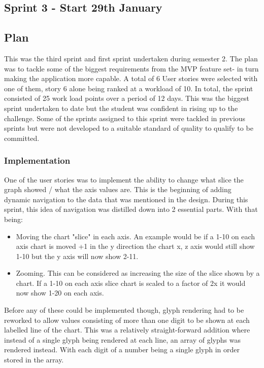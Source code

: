 \subsection{Sprint 3 - Start 29th January}
\subsection{Plan}
This was the third sprint and first sprint undertaken during semester 2. The plan was to tackle some of the biggest requirements from the MVP feature set- in turn making the application more capable. A total of 6 User stories were selected with one of them, story 6 alone being ranked at a workload of 10. In total, the sprint consisted of 25 work load points over a period of 12 days. This was the biggest sprint undertaken to date but the student was confident in rising up to the challenge. Some of the sprints assigned to this sprint were tackled in previous sprints but were not developed to a suitable standard of quality to qualify to be committed.

\subsubsection{Implementation}

One of the user stories was to implement the ability to change what slice the graph showed / what the axis values are. This is the beginning of adding dynamic navigation to the data that was mentioned in the design. During this sprint, this idea of navigation was distilled down into 2 essential parts. With that being:
\begin{itemize}
    \item Moving the chart "slice" in each axis. An example would be if a 1-10 on each axis chart is moved +1 in the y direction the chart x, z axis would still show 1-10 but the y axis will now show 2-11.
    \item Zooming. This can be considered as increasing the size of the slice shown by a chart. If a 1-10 on each axis slice chart is scaled to a factor of 2x it would now show 1-20 on each axis.
\end{itemize}

Before any of these could be implemented though, glyph rendering had to be reworked to allow values consisting of more than one digit to be shown at each labelled line of the chart. This was a relatively straight-forward addition where instead of a single glyph being rendered at each line, an array of glyphs was rendered instead. With each digit of a number being a single glyph in order stored in the array.

